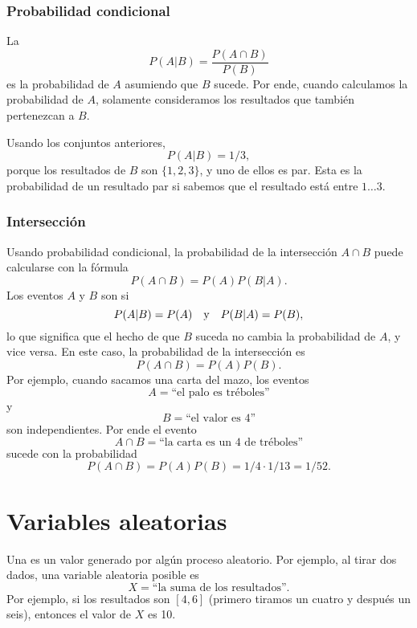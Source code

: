 \subsubsection{Probabilidad condicional}


La  \[P(A | B) = \frac{P(A \cap B)}{P(B)}\]
es la probabilidad de $A$ asumiendo que $B$ sucede. Por ende, cuando
calculamos la probabilidad de $A$, solamente consideramos los resultados
que también pertenezcan a $B$.

Usando los conjuntos anteriores, \[P(A | B)= 1/3,\] porque los resultados
de $B$ son $\{1,2,3\}$, y uno de ellos es par. Esta es la probabilidad
de un resultado par si sabemos que el resultado está entre $1 \ldots 3$.

\subsubsection{Intersección}


Usando probabilidad condicional, la probabilidad de la intersección
$A \cap B$ puede calcularse con la fórmula \[P(A \cap B)=P(A)P(B|A).\]
Los eventos $A$ y $B$ son  si
\[P(A|B)=P(A) \hspace{10px}\textrm{y}\hspace{10px} P(B|A)=P(B),\]
lo que significa que el hecho de que $B$ suceda no cambia la probabilidad
de $A$, y vice versa. En este caso, la probabilidad de la intersección es
\[P(A \cap B)=P(A)P(B).\]
Por ejemplo, cuando sacamos una carta del mazo, los eventos
\[A = \textrm{``el palo es tréboles''}\]
y
\[B = \textrm{``el valor es 4''}\]
son independientes. Por ende el evento
\[A \cap B = \textrm{``la carta es un 4 de tréboles''}\]
sucede con la probabilidad
\[P(A \cap B)=P(A)P(B)=1/4 \cdot 1/13 = 1/52.\]

\section{Variables aleatorias}


Una  es un valor generado por algún proceso
aleatorio. Por ejemplo, al tirar dos dados, una variable aleatoria posible
es \[X=\textrm{``la suma de los resultados''}.\]
Por ejemplo, si los resultados son $[4,6]$ (primero tiramos un cuatro y
después un seis), entonces el valor de $X$ es 10.

